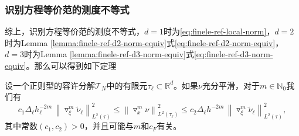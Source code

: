 \subsubsection{识别方程等价范的测度不等式}
综上，识别方程等价范的测度不等式，$d=1$时为\eqref{eq:finele-ref-local-norm}，$d=2$时为Lemma \ref{lemma:finele-ref-d2-norm-equiv}式\eqref{eq:finele-ref-d2-norm-equiv}，$d=3$时为Lemma \ref{lemma:finele-ref-d3-norm-equiv}式\eqref{eq:finele-ref-d3-norm-equiv}。那么可以得到如下定理

\begin{theorem}[识别方程等价范的测度不等式]
\label{theorem:finele-ref-d123-norm-equiv}
设一个正则型的容许分解$\mathcal{T}_{N}$中的有限元$\tau_{\ell} \subset \mathbb{R}^{d}$。如果$\nu$充分平滑，对于$m \in \mathbb{N}_{0}$我们有
\begin{equation*}
    c_{1} \Delta_{\ell} h_{\ell}^{-2m} \, \left\|
    \triangledown_{\xi}^{m} \widetilde{\nu}_{\ell}
    \right\|_{L^{2}(\tau)}^{2}
    \le \left\| \triangledown_{x}^{m} \nu
    \right\|_{L^{2}(\tau_{\ell})}^{2}
    \le c_{2} \Delta_{\ell} h^{-2m} \,
    \left\| \triangledown_{\xi}^{m} \widetilde{\nu}_{\ell}
    \right\|_{L^{2}(\tau)}^{2},
\end{equation*}
其中常数$\left(c_{1}, c_{2} \right)>0$，并且可能与$m$和$c_{F}$有关。
\end{theorem}
